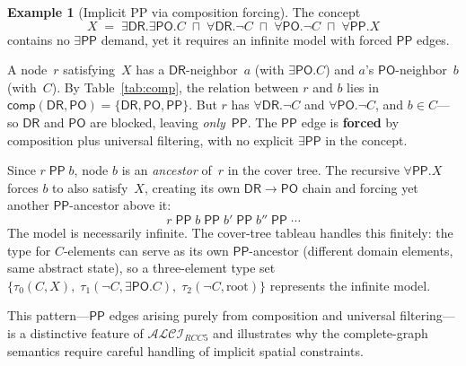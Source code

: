 \documentclass[
]{ceurart}
\theoremstyle{definition}
\newtheorem{examplex}[theorem]{Example}
\newcommand{\ALCIRCC}[1]{\ensuremath{\mathcal{ALCI}_{\mathit{RCC#1}}}}
\newcommand{\DR}{\ensuremath{\mathsf{DR}}}
\newcommand{\PO}{\ensuremath{\mathsf{PO}}}
\newcommand{\PP}{\ensuremath{\mathsf{PP}}}
\newcommand{\comp}{\ensuremath{\mathsf{comp}}}
\begin{document}
\begin{examplex}[Implicit PP via composition forcing]
\label{ex:pp-forcing}
The concept
\[
  X \;=\; \exists\DR.\exists\PO.C
    \;\sqcap\; \forall\DR.\neg C
    \;\sqcap\; \forall\PO.\neg C
    \;\sqcap\; \forall\PP.X
\]
contains no $\exists\PP$ demand, yet it requires an infinite
model with forced $\PP$ edges.

A node~$r$ satisfying~$X$ has a $\DR$-neighbor~$a$
(with $\exists\PO.C$) and $a$'s $\PO$-neighbor~$b$
(with~$C$).  By Table~\ref{tab:comp}, the relation
between $r$ and $b$ lies in
$\comp(\DR,\PO) = \{\DR,\PO,\PP\}$.
But $r$ has $\forall\DR.\neg C$ and $\forall\PO.\neg C$,
and $b \in C$---so $\DR$ and $\PO$ are blocked, leaving
\emph{only}~$\PP$.  The $\PP$ edge is \textbf{forced} by
composition plus universal filtering, with no explicit
$\exists\PP$ in the concept.

Since $r \;\PP\; b$, node $b$ is an \emph{ancestor} of~$r$
in the cover tree.  The recursive $\forall\PP.X$ forces $b$
to also satisfy~$X$, creating its own
$\DR \to \PO$ chain and forcing yet another $\PP$-ancestor
above it:
\[
  r \;\PP\; b \;\PP\; b' \;\PP\; b'' \;\PP\; \cdots
\]
The model is necessarily infinite.  The cover-tree tableau
handles this finitely: the type for $C$-elements can serve as
its own $\PP$-ancestor (different domain elements, same
abstract state), so a three-element type set
$\{\tau_0(C,X),\; \tau_1(\neg C, \exists\PO.C),\;
  \tau_2(\neg C, \text{root})\}$
represents the infinite model.

This pattern---$\PP$ edges arising purely from composition and
universal filtering---is a distinctive feature of $\ALCIRCC{5}$
and illustrates why the complete-graph semantics require careful
handling of implicit spatial constraints.
\end{examplex}
\end{document}
